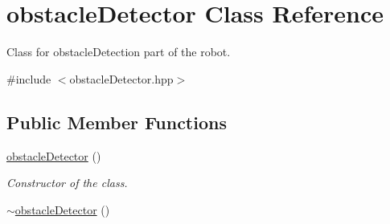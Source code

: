 \hypertarget{classobstacleDetector}{}\section{obstacle\+Detector Class Reference}
\label{classobstacleDetector}


Class for obstacle\+Detection part of the robot.  




{\ttfamily \#include $<$obstacle\+Detector.\+hpp$>$}

\subsection*{Public Member Functions}
\begin{DoxyCompactItemize}
\item 
\hyperlink{classobstacleDetector_a097bd0bdd72d1bc17d167a902f0e85c7}{obstacle\+Detector} ()\hypertarget{classobstacleDetector_a097bd0bdd72d1bc17d167a902f0e85c7}{}\label{classobstacleDetector_a097bd0bdd72d1bc17d167a902f0e85c7}

\begin{DoxyCompactList}\small\item\em Constructor of the class. \end{DoxyCompactList}\item 
\hyperlink{classobstacleDetector_af3e934355f1046a3f235cf680817a590}{$\sim$obstacle\+Detector} ()\hypertarget{classobstacleDetector_af3e934355f1046a3f235cf680817a590}{}\label{classobstacleDetector_af3e934355f1046a3f235cf680817a590}


\end{DoxyCompactItemize}
